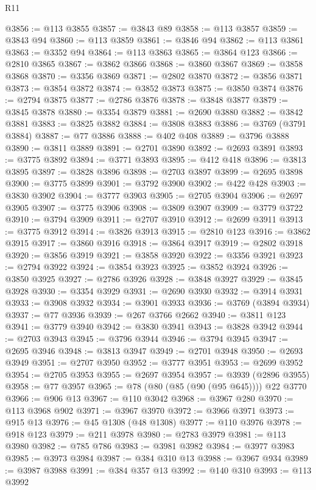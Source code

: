 \begin{lexlean}{R11}
\begin{coremodule}
@3856 := @113 @3855
@3857 := @3843 @89
@3858 := @113 @3857
@3859 := @3843 @94
@3860 := @113 @3859
@3861 := @3846 @94
@3862 := @113 @3861
@3863 := @3352 @94
@3864 := @113 @3863
@3865 := @3864 @123
@3866 := @2810 @3865
@3867 := @3862 @3866
@3868 := @3860 @3867
@3869 := @3858 @3868
@3870 := @3356 @3869
@3871 := @2802 @3870
@3872 := @3856 @3871
@3873 := @3854 @3872
@3874 := @3852 @3873
@3875 := @3850 @3874
@3876 := @2794 @3875
@3877 := @2786 @3876
@3878 := @3848 @3877
@3879 := @3845 @3878
@3880 := @3354 @3879
@3881 := @2690 @3880
@3882 := @3842 @3881
@3883 := @3825 @3882
@3884 := @3808 @3883
@3886 := @3769 (@3791 @3884)
@3887 := @77 @3886
@3888 := @402 @408
@3889 := @3796 @3888
@3890 := @3811 @3889
@3891 := @2701 @3890
@3892 := @2693 @3891
@3893 := @3775 @3892
@3894 := @3771 @3893
@3895 := @412 @418
@3896 := @3813 @3895
@3897 := @3828 @3896
@3898 := @2703 @3897
@3899 := @2695 @3898
@3900 := @3775 @3899
@3901 := @3792 @3900
@3902 := @422 @428
@3903 := @3830 @3902
@3904 := @3777 @3903
@3905 := @2705 @3904
@3906 := @2697 @3905
@3907 := @3775 @3906
@3908 := @3809 @3907
@3909 := @3779 @3722
@3910 := @3794 @3909
@3911 := @2707 @3910
@3912 := @2699 @3911
@3913 := @3775 @3912
@3914 := @3826 @3913
@3915 := @2810 @123
@3916 := @3862 @3915
@3917 := @3860 @3916
@3918 := @3864 @3917
@3919 := @2802 @3918
@3920 := @3856 @3919
@3921 := @3858 @3920
@3922 := @3356 @3921
@3923 := @2794 @3922
@3924 := @3854 @3923
@3925 := @3852 @3924
@3926 := @3850 @3925
@3927 := @2786 @3926
@3928 := @3848 @3927
@3929 := @3845 @3928
@3930 := @3354 @3929
@3931 := @2690 @3930
@3932 := @3914 @3931
@3933 := @3908 @3932
@3934 := @3901 @3933
@3936 := @3769 (@3894 @3934)
@3937 := @77 @3936
@3939 := @267 @3766 @2662
@3940 := @3811 @123
@3941 := @3779 @3940
@3942 := @3830 @3941
@3943 := @3828 @3942
@3944 := @2703 @3943
@3945 := @3796 @3944
@3946 := @3794 @3945
@3947 := @2695 @3946
@3948 := @3813 @3947
@3949 := @2701 @3948
@3950 := @2693 @3949
@3951 := @2707 @3950
@3952 := @3777 @3951
@3953 := @2699 @3952
@3954 := @2705 @3953
@3955 := @2697 @3954
@3957 := @3939 (@2896 @3955)
@3958 := @77 @3957
@3965 := @78 (@80 (@85 (@90 (@95 @645)))) @22 @3770
@3966 := @906 @13
@3967 := @110 @3042
@3968 := @3967 @280
@3970 := @113 @3968 @902
@3971 := @3967 @3970
@3972 := @3966 @3971
@3973 := @915 @13
@3976 := @45 @1308 (@48 @1308)
@3977 := @110 @3976
@3978 := @918 @123
@3979 := @211 @3978
@3980 := @2783 @3979
@3981 := @113 @3980
@3982 := @785 @786
@3983 := @3981 @3982
@3984 := @3977 @3983
@3985 := @3973 @3984
@3987 := @384 @310 @13
@3988 := @3967 @934
@3989 := @3987 @3988
@3991 := @384 @357 @13
@3992 := @140 @310
@3993 := @113 @3992

\end{coremodule}
\end{lexlean}
